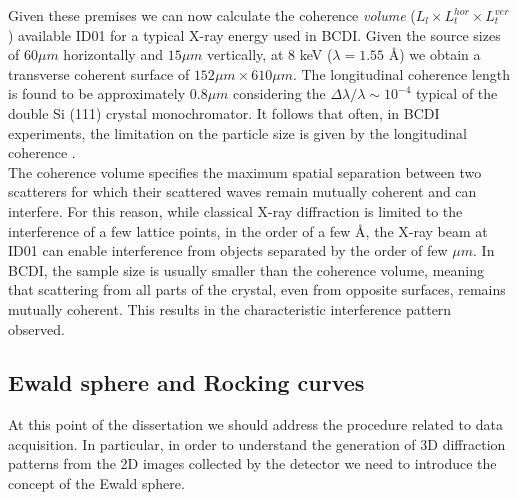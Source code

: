 Given these premises we can now calculate the coherence \textit{volume} ($L_l \times L_t^{hor} \times L_t^{ver}$) available 
ID01 for a typical X-ray energy used in BCDI. Given the source sizes of $60 \mu m$ horizontally and $15 \mu m $ vertically, 
at 8 keV ($\lambda = 1.55$ \r{A}) we obtain a transverse coherent surface of $152 \mu m \times 610 \mu m$. The longitudinal
coherence length is found to be approximately $0.8 \mu m$ considering the $\Delta \lambda / \lambda \sim 10^{-4}$ typical of the 
double Si (111) crystal monochromator. It follows that often, in BCDI experiments, the limitation on the particle size is 
given by the longitudinal coherence \cite{Steven2009}. \\ 

The coherence volume specifies the maximum spatial separation between two scatterers for which their scattered waves 
remain mutually coherent and can interfere. For this reason, while classical X-ray diffraction is limited to the interference 
of a few lattice points, in the order of a few \r{A}, the X-ray beam at ID01 can enable interference from objects separated by the order of few 
$\mu m$. In BCDI, the sample size is usually smaller than the coherence volume, meaning that scattering from all parts 
of the crystal, even from opposite surfaces, remains mutually coherent. This results in the characteristic interference 
pattern observed.

\subsection{Ewald sphere and Rocking curves}

At this point of the dissertation we should address the procedure related to data acquisition. In particular, in order to 
understand the generation of 3D diffraction patterns from the 2D images collected by the detector we need to introduce the 
concept of the Ewald sphere. 


